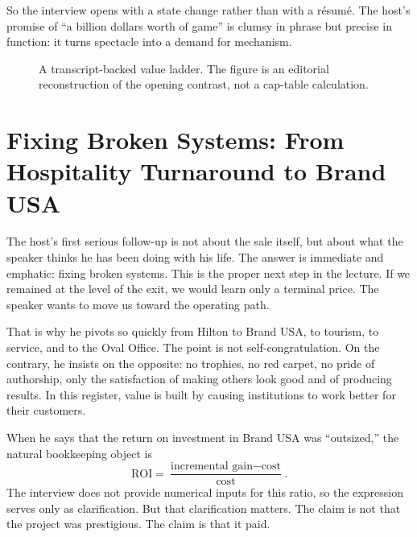 So the interview opens with a state change rather than with a résumé. The host's promise of ``a billion dollars worth of game'' is clumsy in phrase but precise in function: it turns spectacle into a demand for mechanism.

\begin{figure}[h]
\centering
{}
\caption{A transcript-backed value ladder. The figure is an editorial reconstruction of the opening contrast, not a cap-table calculation.}
\end{figure}

\section{Fixing Broken Systems: From Hospitality Turnaround to Brand USA}

The host's first serious follow-up is not about the sale itself, but about what the speaker thinks he has been doing with his life. The answer is immediate and emphatic: fixing broken systems. This is the proper next step in the lecture. If we remained at the level of the exit, we would learn only a terminal price. The speaker wants to move us toward the operating path.

That is why he pivots so quickly from Hilton to Brand USA, to tourism, to service, and to the Oval Office. The point is not self-congratulation. On the contrary, he insists on the opposite: no trophies, no red carpet, no pride of authorship, only the satisfaction of making others look good and of producing results. In this register, value is built by causing institutions to work better for their customers.

When he says that the return on investment in Brand USA was ``outsized,'' the natural bookkeeping object is
\begin{equation}
\mathrm{ROI}=\frac{\text{incremental gain}-\text{cost}}{\text{cost}}.
\end{equation}
The interview does not provide numerical inputs for this ratio, so the expression serves only as clarification. But that clarification matters. The claim is not that the project was prestigious. The claim is that it paid.

